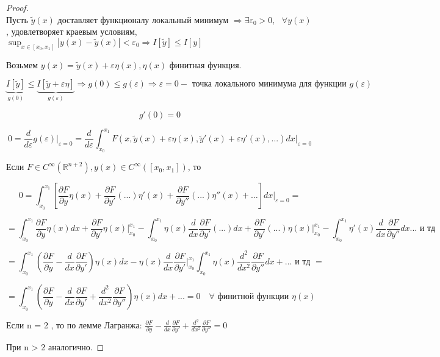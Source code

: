 \documentclass[12pt, a4paper]{report}
\begin{document}
\begin{proof}
     \[   \] 
    Пусть \( \tilde{y }( x) \)  доставляет функционалу локальный минимум \( \Rightarrow  \exists \varepsilon_0 >0 , \text{ }  \forall  y(x )\), удовлетворяет краевым условиям, \( \displaystyle \sup_{x \in [x_0 , x_1 ] } |y(x)-\tilde{y }(x) | < \varepsilon_0  \Rightarrow I[\tilde{y }] \le  I[y] \) 

    Возьмем \( y(x ) = \tilde{y }( x ) + \varepsilon \eta ( x ), \eta(x) \)  финитная функция.

    \[ \underbrace{I[\tilde{ y }]}_{g(0)} \le  \underbrace{I[\tilde{y }+ \varepsilon \eta ]}_{g(\varepsilon)} \Rightarrow g(0 ) \le  g(\varepsilon) \Rightarrow \varepsilon = 0  - \text{ точка локального минимума для функции } g(\varepsilon) \] 

    \[ g ' (0 ) = 0 \]  

    \[ 0 = \frac{d}{d \varepsilon } g(\varepsilon ) \bigg |_{\varepsilon = 0 }  = \frac{d}{d \varepsilon} \int_{x_0 }^{x_1} F ( x, \tilde{y }( x)  + \varepsilon \eta ( x ), \tilde{y }' ( x) + \varepsilon \eta' ( x ), ...) dx \bigg |_{\varepsilon = 0} \] 

    Если \( F \in C^{\infty  } (\mathbb{R} ^{n +2 } ), y(x ) \in C^{\infty  } ([x_0 , x_1 ])    \), то 

    \[ 0 = \int_{x_0 }^{x_1} \left[ \frac{\partial  F }{\partial  y } \eta( x) + \frac{\partial F }{\partial  y' }(... )\eta' ( x )+ \frac{\partial F }{\partial y ''} (...) \eta''(x) +\dots  \right]  dx \bigg | _{\varepsilon = 0 }  =    \] 

    \[ =\int_{x_0 }^{x_1}  \frac{\partial  F }{\partial  y } \eta ( x ) dx + \frac{\partial  F } {\partial  y ' } \eta  ( x ) \bigg |_{x_0 }^{x_1}   - \int_{x_0 }^{x_1} \eta( x ) \frac{d }{dx } \frac{\partial  F }{\partial  y ' } (... )dx + \frac{\partial  F }{ \partial  y ' } (... ) \eta ( x ) \bigg |_{x_0 }^{x_1} - \int_{x_0 }^{x_1}  \eta ' ( x ) \frac{d}{dx } \frac{\partial  F }{\partial  y ''} dx ... \text{ и тд}    \] 

    \[ = \int_{x_0 }^{x_1} \left(  \frac{\partial  F } {\partial  y } - \frac{d}{dx } \frac{\partial F }{\partial  y '}  \right) \eta(x )dx - \eta(x ) \frac{d}{dx } \frac{\partial F }{ \partial  y '}\bigg |_{x_0 }^{x_1 } \int _{x_0 }^{x_1} \eta  ( x ) \frac{d ^2 }{dx ^2 } \frac{\partial F }{\partial y ''} dx +... \text{ и тд }       =  \] 

    \[ =\int_{x_0 }^{x_1} \left(  \frac{\partial  F } {\partial  y } - \frac{d}{dx } \frac{\partial F }{\partial  y '} + \frac{d ^2 }{d x ^2 } \frac{\partial F }{\partial y ''}  \right) \eta(x )dx +...  = 0 \quad \forall \text{ финитной функции  } \eta( x) \] 

    Если n = 2 , то по лемме Лагранжа: \( \displaystyle  \frac{\partial  F } {\partial  y } - \frac{d}{dx }  \frac{\partial  F } { \partial y ' } + \frac{d ^2 }{dx ^2 }  \frac{\partial  F }{ \partial  y''}  =0   \) 

    При n > 2 аналогично.

\end{proof}
\end{document}
